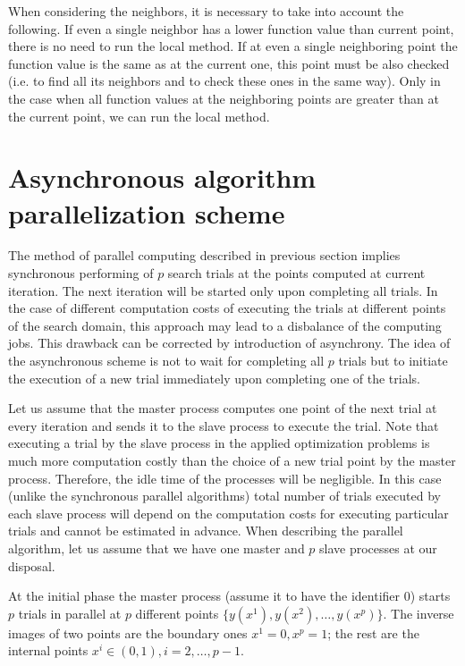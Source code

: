\documentclass{svproc}
\begin{document}
When considering the neighbors, it is necessary to take into account the following. If even a single  neighbor has a lower function value than current point, there is no need to run the local method. If at  even a single neighboring point the function value is the same as at the current one, this point must be also checked (i.e. to find all its neighbors and to check these ones in the same way). Only in the case when  all function values at the neighboring points are greater than at the current point, we can run the local  method.


\section{Asynchronous algorithm parallelization scheme}\label{SecASP}

The method of parallel computing described in  previous section implies synchronous  performing of $p$ search trials at the points computed at current iteration. The next iteration will be  started only upon completing all trials. In the case of different computation costs of executing the trials at different points of the search  domain, this approach may lead to a disbalance of the computing jobs.  This drawback can be corrected by introduction of asynchrony. The idea of the asynchronous scheme is not to wait for completing all $p$ trials but to initiate the  execution of a new trial immediately upon completing one of the trials. 

Let us assume that the master process computes one point of the next trial at every iteration and sends  it to the slave process to execute the trial. Note that executing a trial by the slave process in  the applied optimization problems is much more computation costly than the choice of a new trial point  by the master process. Therefore, the idle time of the processes will be negligible. In this  case (unlike the synchronous parallel algorithms) total number of trials executed by each slave  process will depend on the computation costs for executing particular trials and cannot be estimated in  advance. When describing the parallel algorithm, let us assume that we have one master and $p$ slave processes at our disposal.

At the initial phase the master process (assume it to have the identifier $0$) starts $p$ trials in parallel at $p$ different points $\{y\left(x^1\right),y\left(x^2\right),\ldots,y\left(x^p\right)\}$.
The inverse images of two points are the boundary ones $x^1=0,x^p=1$; the rest are the internal points $x^i\in\left(0,1\right),i=2,\ldots,p-1$.
\end{document}

